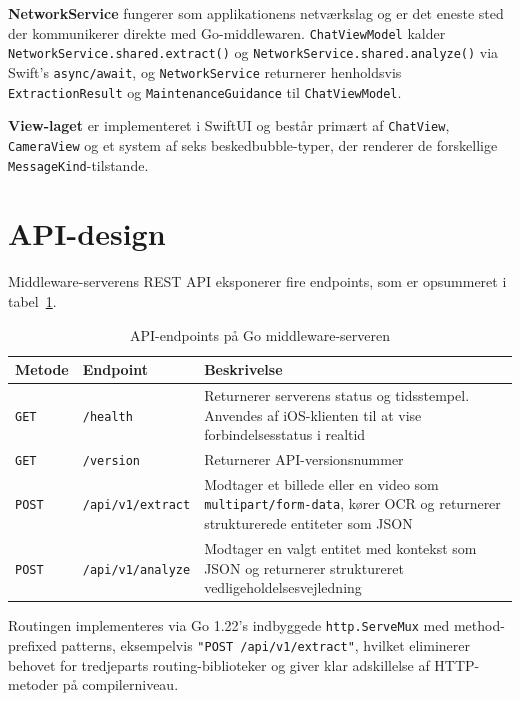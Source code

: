 \textbf{NetworkService} fungerer som applikationens netværkslag og er det eneste sted der kommunikerer direkte med Go-middlewaren. \texttt{ChatViewModel} kalder \texttt{NetworkService.shared.extract()} og \texttt{NetworkService.shared.analyze()} via Swift's \texttt{async/await}, og \texttt{NetworkService} returnerer henholdsvis \texttt{ExtractionResult} og \texttt{MaintenanceGuidance} til \texttt{ChatViewModel}.

\textbf{View-laget} er implementeret i SwiftUI og består primært af \texttt{ChatView}, \texttt{CameraView} og et system af seks beskedbubble-typer, der renderer de forskellige \texttt{MessageKind}-tilstande.

\section{API-design}
\label{sec:api-design}

Middleware-serverens REST API eksponerer fire endpoints, som er opsummeret i tabel~\ref{tab:api-endpoints}.

\begin{table}[H]
  \centering
  \caption{API-endpoints på Go middleware-serveren}
  \label{tab:api-endpoints}
  \begin{tabularx}{\textwidth}{@{}llX@{}}
    \toprule
    \textbf{Metode} & \textbf{Endpoint} & \textbf{Beskrivelse} \\
    \midrule
    \texttt{GET} & \texttt{/health} & Returnerer serverens status og tidsstempel. Anvendes af iOS-klienten til at vise forbindelsesstatus i realtid \\
    \addlinespace
    \texttt{GET} & \texttt{/version} & Returnerer API-versionsnummer \\
    \addlinespace
    \texttt{POST} & \texttt{/api/v1/extract} & Modtager et billede eller en video som \texttt{multipart/form-data}, kører OCR og returnerer strukturerede entiteter som JSON \\
    \addlinespace
    \texttt{POST} & \texttt{/api/v1/analyze} & Modtager en valgt entitet med kontekst som JSON og returnerer struktureret vedligeholdelsesvejledning \\
    \bottomrule
  \end{tabularx}
\end{table}

Routingen implementeres via Go 1.22's indbyggede \texttt{http.ServeMux} med method-prefixed patterns, eksempelvis \texttt{"POST /api/v1/extract"}, hvilket eliminerer behovet for tredjeparts routing-biblioteker og giver klar adskillelse af HTTP-metoder på compilerniveau.

